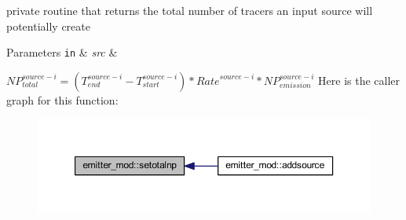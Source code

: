 private routine that returns the total number of tracers an input source will potentially create 
\begin{DoxyParams}[1]{Parameters}
\mbox{\tt in}  & {\em src} & \\
\hline
\end{DoxyParams}
${NP}_{total}^{source-i}=(T_{end}^{source-i}-T_{start}^{source-i})*{Rate}^{source-i}*{NP}_{emission}^{source-i}$ Here is the caller graph for this function\+:
\nopagebreak
\begin{figure}[H]
\begin{center}
\leavevmode
\includegraphics[width=350pt]{namespaceemitter__mod_a5c219dd6692a761ad4bf968ae750fcc6_icgraph}
\end{center}
\end{figure}
